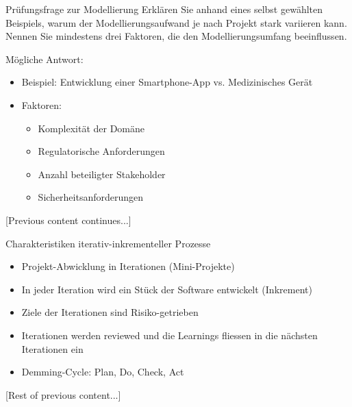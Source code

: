 \begin{example}{Prüfungsfrage zur Modellierung}
Erklären Sie anhand eines selbst gewählten Beispiels, warum der Modellierungsaufwand je nach Projekt stark variieren kann. Nennen Sie mindestens drei Faktoren, die den Modellierungsumfang beeinflussen.

Mögliche Antwort:
\begin{itemize}
    \item Beispiel: Entwicklung einer Smartphone-App vs. Medizinisches Gerät
    \item Faktoren:
    \begin{itemize}
        \item Komplexität der Domäne
        \item Regulatorische Anforderungen
        \item Anzahl beteiligter Stakeholder
        \item Sicherheitsanforderungen
    \end{itemize}
\end{itemize}
\end{example}

[Previous content continues...]

\begin{concept}{Charakteristiken iterativ-inkrementeller Prozesse}
\begin{itemize}
    \item Projekt-Abwicklung in Iterationen (Mini-Projekte)
    \item In jeder Iteration wird ein Stück der Software entwickelt (Inkrement)
    \item Ziele der Iterationen sind Risiko-getrieben
    \item Iterationen werden reviewed und die Learnings fliessen in die nächsten Iterationen ein
    \item Demming-Cycle: Plan, Do, Check, Act
\end{itemize}
\end{concept}

[Rest of previous content...]

